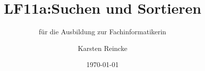 \documentclass[]{beamer}
\title{LF11a:Suchen und Sortieren}
\subtitle{für die Ausbildung zur Fachinformatikerin}
\institute{GS-LDK}
\author{Karsten Reincke}
\date{\today}
\def\cfgGl{../../../cfg.gl/}
\begin{document}

\begin{frame}
  \titlepage
\end{frame}






\logo{}
\newpage



%
\end{document}
